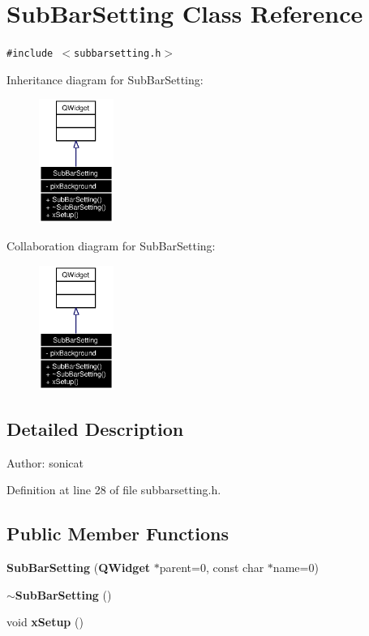 \section{Sub\-Bar\-Setting Class Reference}
\label{classSubBarSetting}
{\tt \#include $<$subbarsetting.h$>$}

Inheritance diagram for Sub\-Bar\-Setting:\begin{figure}[H]
\begin{center}
\leavevmode
\includegraphics[width=69pt]{classSubBarSetting__inherit__graph}
\end{center}
\end{figure}
Collaboration diagram for Sub\-Bar\-Setting:\begin{figure}[H]
\begin{center}
\leavevmode
\includegraphics[width=69pt]{classSubBarSetting__coll__graph}
\end{center}
\end{figure}


\subsection{Detailed Description}
\begin{Desc}
\item[Author:]sonicat \end{Desc}




Definition at line 28 of file subbarsetting.h.\subsection*{Public Member Functions}
\begin{CompactItemize}
\item 
{\bf Sub\-Bar\-Setting} ({\bf QWidget} $\ast$parent=0, const char $\ast$name=0)
\item 
{\bf $\sim$Sub\-Bar\-Setting} ()
\item 
void {\bf x\-Setup} ()
\end{CompactItemize}
